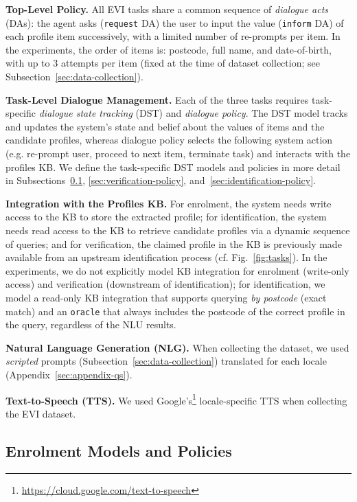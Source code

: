 \documentclass[11pt]{article}
\newcommand{\rparagraph}[1]{\vspace{1.4mm}\noindent\textbf{#1.}}
\begin{document}
{\rparagraph{Top-Level Policy}
All EVI tasks share a common sequence of \textit{dialogue acts} (DAs):
the agent asks (\texttt{request} DA) the user
to input the value (\texttt{inform} DA) of each profile item successively,
with a limited number of re-prompts per item.
In the experiments,
the order of items is: postcode, full name, and date-of-birth,
with up to $3$ attempts per item
(fixed at the time of dataset collection; see Subsection~\ref{sec:data-collection}).


\rparagraph{Task-Level Dialogue Management}
Each of the three tasks requires task-specific \textit{dialogue state tracking} (DST)
and \textit{dialogue policy}.
The DST model tracks and updates the system's state and belief about the values of items and the candidate profiles,
whereas dialogue policy selects the following system action
(e.g. re-prompt user, proceed to next item, terminate task)
and interacts with the profiles KB.
We define the task-specific DST models and policies in more detail
in Subsections~\ref{sec:enrolment-policy}, \ref{sec:verification-policy}, and~\ref{sec:identification-policy}.

\rparagraph{Integration with the Profiles KB}
For enrolment,
the system needs write access to the KB to store the extracted profile; for identification, the system needs read access to the KB to retrieve candidate profiles via a dynamic sequence of queries;
and for verification,
the claimed profile in the KB is previously made available from an upstream identification process (cf. Fig.~\ref{fig:tasks}).
In the experiments,
we do not explicitly model KB integration for enrolment (write-only access) and verification (downstream of identification);
for identification, we model a read-only KB integration
that supports querying \textit{by postcode} (exact match)
and an \texttt{oracle} that always includes the postcode of the correct profile in the query, regardless of the NLU results.

\rparagraph{Natural Language Generation (NLG)}
When collecting the dataset,
we used \textit{scripted} prompts (Subsection~\ref{sec:data-collection})
translated for each locale (Appendix~\ref{sec:appendix-qs}).

\rparagraph{Text-to-Speech (TTS)}
We used Google's\footnote{\url{https://cloud.google.com/text-to-speech}}
locale-specific TTS when collecting the EVI dataset.




\subsection{Enrolment Models and Policies}
\label{sec:enrolment-policy}


}
\end{document}
